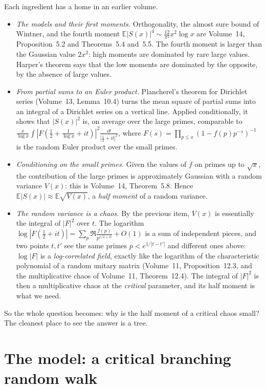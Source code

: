 Each ingredient has a home in an earlier volume.
\begin{itemize}
\item \emph{The models and their first moments.} Orthogonality, the almost sure bound of Wintner, and the fourth moment $\mathbb E|S(x)|^4\sim\frac{12}{\pi^2}x^2\log x$ are Volume~14, Proposition~5.2 and Theorems~5.4 and~5.5. The fourth moment is larger than the Gaussian value $2x^2$: high moments are dominated by rare large values. Harper's theorem says that the low moments are dominated by the opposite, by the absence of large values.
\item \emph{From partial sums to an Euler product.} Plancherel's theorem for Dirichlet series (Volume~13, Lemma~10.4) turns the mean square of partial sums into an integral of a Dirichlet series on a vertical line. Applied conditionally, it shows that $|S(x)|^2$ is, on average over the large primes, comparable to $\frac x{\log x}\int|F(\frac12+\frac1{\log x}+it)|^2\frac{\dd t}{|\frac12+it|^2}$, where $F(s)=\prod_{p\le x}(1-f(p)p^{-s})^{-1}$ is the random Euler product over the small primes.
\item \emph{Conditioning on the small primes.} Given the values of $f$ on primes up to $\sqrt x$, the contribution of the large primes is approximately Gaussian with a random variance $V(x)$: this is Volume~14, Theorem~5.8. Hence $\mathbb E|S(x)|\approx\mathbb E\sqrt{V(x)}$, a \emph{half moment} of a random variance.
\item \emph{The random variance is a chaos.} By the previous item, $V(x)$ is essentially the integral of $|F|^2$ over $t$. The logarithm $\log|F(\frac12+it)|=\sum_p\Re\frac{f(p)}{p^{1/2+it}}+O(1)$ is a sum of independent pieces, and two points $t,t'$ see the same primes $p<e^{1/|t-t'|}$ and different ones above: $\log|F|$ is a \emph{log-correlated field}, exactly like the logarithm of the characteristic polynomial of a random unitary matrix (Volume~11, Proposition~12.3, and the multiplicative chaos of Volume~11, Theorem~12.4). The integral of $|F|^2$ is then a multiplicative chaos at the \emph{critical} parameter, and its half moment is what we need.
\end{itemize}

So the whole question becomes: why is the half moment of a critical chaos small? The cleanest place to see the answer is a tree.

\section{The model: a critical branching random walk}

